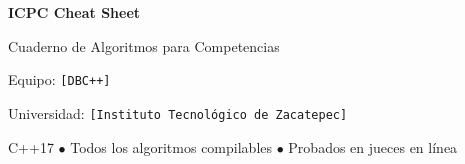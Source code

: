 \documentclass[10pt,a4paper]{article}
\begin{document}
\begin{titlepage}
\centering
\vspace*{4cm}
{\Huge\bfseries ICPC Cheat Sheet\par}
\vspace{1cm}
{\Large Cuaderno de Algoritmos para Competencias\par}
\vspace{2cm}
{\large Equipo: \texttt{[DBC++]}\par}
\vspace{0.5cm}
{\large Universidad: \texttt{[Instituto Tecnológico de Zacatepec]}\par}
\vspace{0.5cm}
\vspace{3cm}
{\normalsize C++17 $\bullet$ Todos los algoritmos compilables $\bullet$ Probados en jueces en l\'inea\par}
\end{titlepage}

\tableofcontents
\newpage

\end{document}
